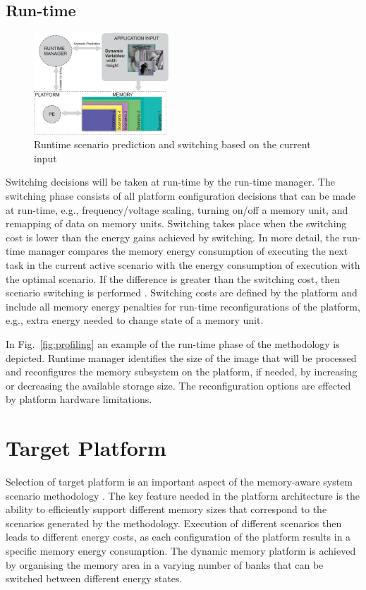 \documentclass[a4paper,conference]{IEEEtran}
\begin{document}
\subsection{Run-time}

\begin{figure}[!t]
\centering
\includegraphics[width=0.45\textwidth]{Images/switching.eps}
\caption{Runtime scenario prediction and switching based on the current input}
\label{fig:runtime}
\end{figure}

Switching decisions will be taken at run-time by the run-time manager. The switching phase consists of all platform configuration decisions that can be made at run-time, e.g., frequency/voltage scaling, turning on/off a memory unit, and remapping of data on memory units. Switching takes place when the switching cost is lower than the energy gains achieved by switching. In more detail, the run-time manager compares the memory energy consumption of executing the next task in the current active scenario with the energy consumption of execution with the optimal scenario. If the difference is greater than the switching cost, then scenario switching is performed \cite{tcm}. Switching costs are defined by the platform and include all memory energy penalties for run-time reconfigurations of the platform, e.g., extra energy needed to change state of a memory unit.

In Fig.~\ref{fig:profiling} an example of the run-time phase of the methodology is depicted. Runtime manager identifies the size of the image that will be processed and reconfigures the memory subsystem on the platform, if needed, by increasing or decreasing the available storage size. The reconfiguration options are effected by platform hardware limitations.

\section{Target Platform}
\label{sec:platform}

Selection of target platform is an important aspect of the memory-aware system scenario methodology \cite{Fil12}. The key feature needed in the platform architecture is the ability to efficiently support different memory sizes that correspond to the scenarios generated by the methodology. Execution of different scenarios then leads to different energy costs, as each configuration of the platform results in a specific memory energy consumption. The dynamic memory platform is achieved by organising the memory area in a varying number of banks that can be switched between different energy states. 
\end{document}
